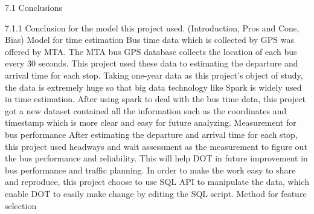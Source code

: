 \documentclass[12pt,journal,compsoc]{IEEEtran}
\begin{document}
7.1 Conclusions

7.1.1 Conclusion for the model this project used. (Introduction, Pros and Cons, Bias)
Model for time estimation
Bus time data which is collected by GPS was offered by MTA. The MTA bus GPS database collects the location of each bus every 30 seconds. This project used these data to estimating the departure and arrival time for each stop.
Taking one-year data as this project’s object of study, the data is extremely huge so that big data technology like Spark is widely used in time estimation.
After using spark to deal with the bus time data, this project got a new dataset contained all the information such as the coordinates and timestamp which is more clear and easy for future analyzing.
Measurement for bus performance
After estimating the departure and arrival time for each stop, this project used headways and wait assessment as the measurement to figure out the bus performance and reliability. This will help DOT in future improvement in bus performance and traffic planning.
 In order to make the work easy to share and reproduce, this project choose to use SQL API to manipulate the data, which enable DOT to easily make change by editing the SQL script. 
Method for feature selection
\end{document}
